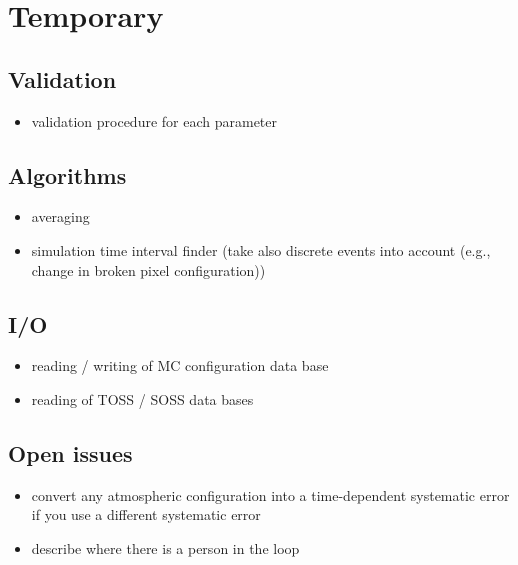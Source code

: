 \section{Temporary}

\subsection{Validation}

\begin{itemize}

\item validation procedure for each parameter

\end{itemize}

\subsection{Algorithms}

\begin{itemize}

\item averaging 
\item simulation time interval finder (take also discrete events into account (e.g., change in broken pixel configuration))
 
\end{itemize}

\subsection{I/O}

\begin{itemize}

\item reading / writing of MC configuration data base

\item reading of TOSS / SOSS data bases

\end{itemize}

\subsection{Open issues}

\begin{itemize}

\item  convert any atmospheric configuration into a time-dependent systematic error if you use a different systematic error

\item describe where there is a person in the loop

\end{itemize}